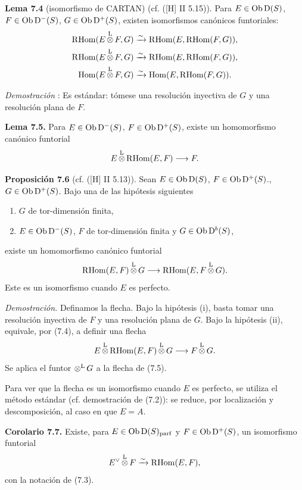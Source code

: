 
\providecommand{\sisi}[2]{#2}

\textbf{Lema 7.4} (isomorfismo de CARTAN) (cf. ([H] II 5.15)). Para \(E\in\operatorname{Ob}\mathrm D(S)\), \(F\in\operatorname{Ob}\mathrm D^-(S)\), \(G\in\operatorname{Ob}\mathrm D^+(S)\), existen isomorfismos canónicos funtoriales:
\[
\begin{aligned}
\mathrm R\!\operatorname{Hom}(E\mathop{\otimes}^{\mathrm L} F,G)&\xrightarrow{\sim}\mathrm R\!\operatorname{Hom}(E,\mathrm R\!\operatorname{Hom}(F,G)),\\
\mathrm R\!\operatorname{Hom}(E\mathop{\otimes}^{\mathrm L} F,G)&\xrightarrow{\sim}\mathrm R\!\operatorname{Hom}(E,\mathrm R\!\operatorname{Hom}(F,G)),\\
\operatorname{Hom}(E\mathop{\otimes}^{\mathrm L} F,G)&\xrightarrow{\sim}\operatorname{Hom}(E,\mathrm R\!\operatorname{Hom}(F,G)).
\end{aligned}
\]

\emph{Demostración} : Es estándar: tómese una resolución inyectiva de \(G\) y una resolución plana de \(F\).

\textbf{Lema 7.5.} Para \(E\in\operatorname{Ob}\mathrm D^-(S)\), \(F\in\operatorname{Ob}\mathrm D^+(S)\), existe un homomorfismo canónico funtorial
\[
  E\mathop{\otimes}^{\mathrm L}\mathrm R\!\operatorname{Hom}(E,F)\longrightarrow F.
\]

\textbf{Proposición 7.6} (cf. ([H] II 5.13)). Sean \(E\in\operatorname{Ob}\mathrm D(S)\), \(F\in\operatorname{Ob}\mathrm D^+(S)\)., \(G\in\operatorname{Ob}\mathrm D^+(S)\). Bajo una de las hipótesis siguientes
\begin{enumerate}[label=\roman*)]
\item \(G\) de tor-dimensión finita,
\item \(E\in\operatorname{Ob}\mathrm D^-(S)\), \(F\) de tor-dimensión finita y \(G\in\operatorname{Ob}\mathrm D^b(S)\),
\end{enumerate}
existe un homomorfismo canónico funtorial
\[
  \mathrm R\!\operatorname{Hom}(E,F)\mathop{\otimes}^{\mathrm L} G
  \longrightarrow
  \mathrm R\!\operatorname{Hom}(E,F\mathop{\otimes}^{\mathrm L} G).
\]
Este es un isomorfismo cuando \(E\) es perfecto.

\emph{Demostración.} Definamos la flecha. Bajo la hipótesis (i), basta tomar una resolución inyectiva de \(F\) y una resolución plana de \(G\). Bajo la hipótesis (ii), equivale, por (7.4), a definir una flecha
\[
  E\mathop{\otimes}^{\mathrm L}\mathrm R\!\operatorname{Hom}(E,F)\mathop{\otimes}^{\mathrm L} G\longrightarrow F\mathop{\otimes}^{\mathrm L} G.
\]
Se aplica el funtor \(\mathop{\otimes}^{\mathrm L} G\) a la flecha de (7.5).

Para ver que la flecha es un isomorfismo cuando \(E\) es perfecto, se utiliza el método estándar (cf. demostración de (7.2)): se reduce, por localización y descomposición, al caso en que \(E=A\).

\textbf{Corolario 7.7.} Existe, para \(E\in\operatorname{Ob}\mathrm D(S)_{\mathrm{parf}}\) y \(F\in\operatorname{Ob}\mathrm D^+(S)\), un isomorfismo funtorial
\[
  E^\vee\mathop{\otimes}^{\mathrm L} F\xrightarrow{\sim}\mathrm R\!\operatorname{Hom}(E,F),
\]
con la notación de (7.3).

